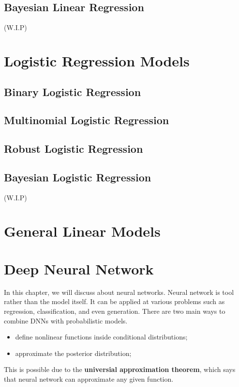 \documentclass{report}
\begin{document}
    \section{Bayesian Linear Regression}

    (W.I.P)

\chapter{Logistic Regression Models}

    \section{Binary Logistic Regression}
    \section{Multinomial Logistic Regression}
    \section{Robust Logistic Regression}
    \section{Bayesian Logistic Regression}

    (W.I.P)

\chapter{General Linear Models}

\chapter{Deep Neural Network}
    In this chapter, we will discuss about neural networks.
    Neural network is tool rather than the model itself.
    It can be applied at various problems such as regression, classification, and even generation.
    There are two main ways to combine DNNs with probabilistic models.
    \begin{itemize}
        \item define nonlinear functions inside conditional distributions;
        \item approximate the posterior distribution;
    \end{itemize}
    This is possible due to the \textbf{universial approximation theorem}, which says that
    neural network can approximate any given function.
    
\end{document}
